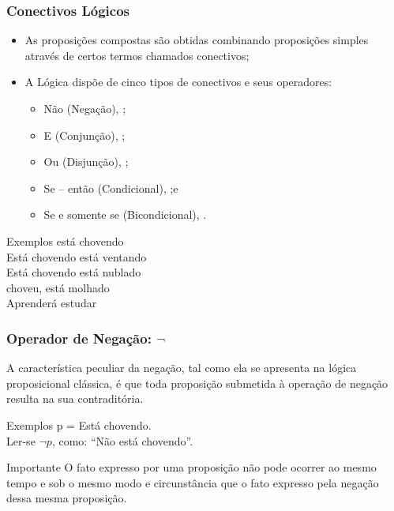 \documentclass{beamer}
\begin{document}
\begin{frame}
\frametitle{Conectivos Lógicos}

\begin{itemize}
	\item As proposições compostas são obtidas combinando proposições simples através de certos termos chamados conectivos;
	\item A Lógica dispõe de cinco tipos de conectivos e seus operadores:
	\begin{itemize}
		\item Não (Negação), \structure{$\neg$};
		\item E (Conjunção), \structure{$\wedge$};
		\item Ou (Disjunção), \structure{$\vee$};
		\item Se -- então (Condicional), \structure{$\rightarrow$};e
		\item Se e somente se (Bicondicional), \structure{$\leftrightarrow$}.
	\end{itemize}
\end{itemize} \vfill

\begin{exampleblock}{Exemplos}
 está chovendo\\
Está chovendo  está ventando\\
Está chovendo  está nublado\\
 choveu,  está molhado\\
Aprenderá  estudar
\end{exampleblock}
\end{frame}

\begin{frame}
\frametitle{Operador de Negação: $\neg$}

A característica peculiar da negação, tal como ela se apresenta na lógica proposicional clássica, é que toda proposição submetida à operação de negação resulta na sua contraditória.
\vfill

\begin{exampleblock}{Exemplos}
p = Está chovendo.\\
Ler-se $\neg p$, como: ``Não está chovendo''.
\end{exampleblock}\vfill

\begin{alertblock}{Importante}
O fato expresso por uma proposição não pode ocorrer ao mesmo tempo e sob o mesmo modo e circunstância que o fato expresso pela negação dessa mesma proposição.
\end{alertblock}
\end{frame}
\end{document}
